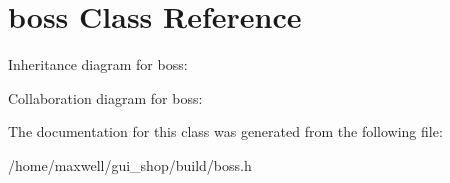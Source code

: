 \hypertarget{classboss}{}\section{boss Class Reference}
\label{classboss}


Inheritance diagram for boss\+:


Collaboration diagram for boss\+:


The documentation for this class was generated from the following file\+:\begin{DoxyCompactItemize}
\item 
/home/maxwell/gui\+\_\+shop/build/boss.\+h\end{DoxyCompactItemize}
